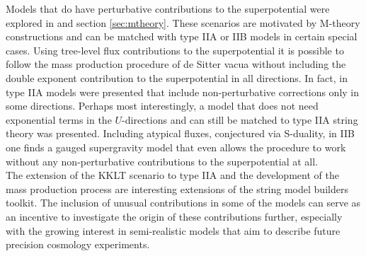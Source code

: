 \documentclass[a4paper,12pt,twoside,openright]{report}
\begin{document}
Models that do have perturbative contributions to the superpotential were explored in \cite{Cribiori:2019hrb} and section \ref{sec:mtheory}. These scenarios are motivated by M-theory constructions and can be matched with type IIA or IIB models in certain special cases. Using tree-level flux contributions to the superpotential it is possible to follow the mass production procedure of de Sitter vacua without including the double exponent contribution to the superpotential in all directions. In fact, in type IIA models were presented that include non-perturbative corrections only in some directions. Perhaps most interestingly, a model that does not need exponential terms in the $U$-directions and can still be matched to type IIA string theory was presented. Including atypical fluxes, conjectured via S-duality, in IIB one finds a gauged supergravity model that even allows the procedure to work without any non-perturbative contributions to the superpotential at all.\\
The extension of the KKLT scenario to type IIA and the development of the mass production process are interesting extensions of the string model builders toolkit. The inclusion of unusual contributions in some of the models can serve as an incentive to investigate the origin of these contributions further, especially with the growing interest in semi-realistic models that aim to describe future precision cosmology experiments.
\end{document}
